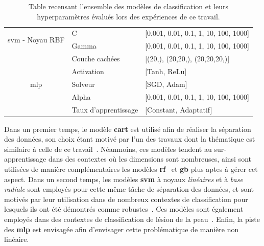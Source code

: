 \begin{table}[H]
\begin{tabular}{cll}
        \multirow{2}{*}{\gls{svm} - Noyau RBF}          & C                         & [0.001, 0.01, 0.1, 1, 10, 100, 1000]      \\ \cmidrule{2-3}   
                                                        & Gamma                     & [0.001, 0.01, 0.1, 1, 10, 100, 1000]      \\ \midrule 
        \multirow{5}{*}{\gls{mlp}}                      & Couche cachées            & [(20,), (20,20,), (20,20,20,)]            \\ \cmidrule{2-3}
                                                        & Activation                & [Tanh, ReLu]                              \\ \cmidrule{2-3}
                                                        & Solveur                   & [SGD, Adam]                               \\ \cmidrule{2-3}
                                                        & Alpha                     & [0.001, 0.01, 0.1, 1, 10, 100, 1000]      \\ \cmidrule{2-3}
                                                        & Taux d'apprentissage      & [Constant, Adaptatif]                     \\ \bottomrule 
    \end{tabular} 
    \caption{Table recensant l'ensemble des modèles de classification et leurs hyperparamètres évalués lors des expériences de ce travail.}
    \label{tab:image_classification_models_hyperparameters}
\end{table}\par

Dans un premier temps, le modèle \textbf{\gls{cart}} est utilisé afin de réaliser la séparation des données, son choix étant motivé par l'un des travaux dont la thématique est similaire à celle de ce travail~\cite{Wiltgen2008}. Néanmoins, ces modèles tendent au sur-apprentissage dans des contextes où les dimensions sont nombreuses, ainsi sont utilisées de manière complémentaires les modèles \textbf{\gls{rf}}~\cite{Breiman2001} et \textbf{\gls{gb}} plus aptes à gérer cet aspect. Dans un second temps, les modèles \textbf{\gls{svm}} à noyaux \textit{linéaires} et à \textit{base radiale} sont employés pour cette même tâche de séparation des données, et sont motivés par leur utilisation dans de nombreux contextes de classification pour lesquels ils ont été démontrés comme robustes~\cite{Smach2008a}. Ces modèles sont également employés dans des contextes de classification de lésion de la peau~\cite{Celebi2007}. Enfin, la piste des \textbf{\gls{mlp}} est envisagée afin d'envisager cette problématique de manière non linéaire.\par

